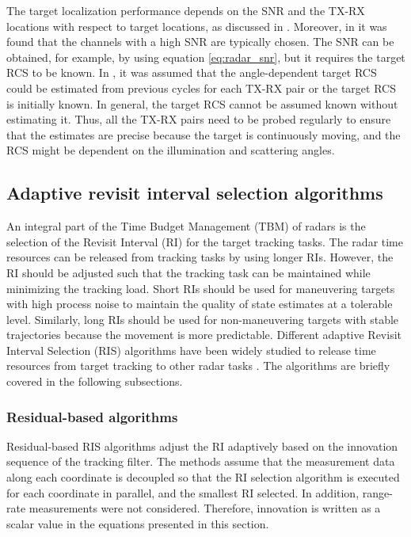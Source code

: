 \documentclass[english, 12pt, a4paper, elec, utf8, a-1b, online]{aaltothesis}
\begin{document}
The target localization performance depends on the SNR and the TX-RX locations with respect to target locations, as discussed in \cite{Sun2014}.
Moreover, in \cite{Sun2014} it was found that the channels with a high SNR are typically chosen.
The SNR can be obtained, for example, by using equation \eqref{eq:radar_snr}, but it requires the target RCS to be known.
In \cite{Godrich2011a, Godrich2011, Sun2014}, it was assumed that the angle-dependent target RCS could be estimated from previous cycles for each TX-RX pair or the target RCS is initially known.
In general, the target RCS cannot be assumed known without estimating it. 
Thus, all the TX-RX pairs need to be probed regularly to ensure that the estimates are precise because the target is continuously moving, and the RCS might be dependent on the illumination and scattering angles.


\subsection{Adaptive revisit interval selection algorithms} \label{sec:tbm_ri}

An integral part of the Time Budget Management (TBM) of radars is the selection of the Revisit Interval (RI) for the target tracking tasks.
The radar time resources can be released from tracking tasks by using longer RIs. 
However, the RI should be adjusted such that the tracking task can be maintained while minimizing the tracking load.
Short RIs should be used for maneuvering targets with high process noise to maintain the quality of state estimates at a tolerable level. 
Similarly, long RIs should be used for non-maneuvering targets with stable trajectories because the movement is more predictable.
Different adaptive Revisit Interval Selection (RIS) algorithms have been widely studied to release time resources from target tracking to other radar tasks \cite{Cohen1986, Gardner1988, Munu1992, ChengTing2007, Baek2010, Watson1993, Charlish2015, Keuk1975, Shin1995, Benoudnine2006}.
The algorithms are briefly covered in the following subsections.

\subsubsection{Residual-based algorithms}

Residual-based RIS algorithms adjust the RI adaptively based on the innovation sequence of the tracking filter.
The methods assume that the measurement data along each coordinate is decoupled so that the RI selection algorithm is executed for each coordinate in parallel, and the smallest RI selected.
In addition, range-rate measurements were not considered.
Therefore, innovation is written as a scalar value in the equations presented in this section.
\end{document}
